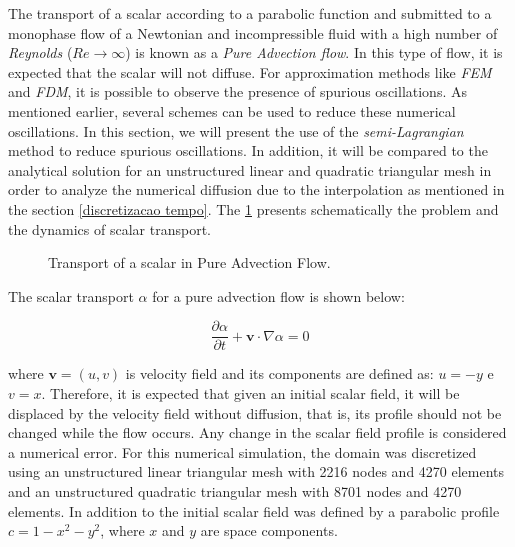 The transport of a scalar according to a parabolic function and 
submitted to a monophase flow of a Newtonian and incompressible fluid 
with a high number of \textit{Reynolds} 
($\textit{Re} \rightarrow \infty$) is known as a 
\textit{Pure Advection flow}. In this type of flow, 
it is expected that the scalar will not diffuse. 
For approximation methods like \textit{FEM} and \textit{FDM}, 
it is possible to observe the presence of spurious oscillations. 
As mentioned earlier, several schemes can be used to reduce these 
numerical oscillations. In this section, we will present the use 
of the \textit{semi-Lagrangian} method to reduce spurious oscillations.
In addition, it will be compared to the analytical solution for an
unstructured linear and quadratic triangular mesh 
in order to analyze the numerical diffusion due to the interpolation
as mentioned in the section \ref{discretizacao tempo}. 
The \ref{conveccao} presents schematically the problem and 
the dynamics of scalar transport.

\vspace{0.5cm}
\begin{figure}[H]
\caption{Transport of a scalar in Pure Advection Flow.}
\begin{center}
\end{center}
\label{conveccao}
\end{figure}

\medskip
\noindent
The scalar transport $\alpha$ for a pure advection flow is shown below:


\begin{equation}
 \frac{\partial \alpha}{\partial t} 
 + 
 \textbf{v} \cdot \nabla \alpha
 = 0
\end{equation}

\noindent
where $\textbf{v} = (u,v)$ is velocity field and its components are
defined as: $u = -y$ e $v = x$. 
Therefore, it is expected that given an initial scalar field, 
it will be displaced by the velocity field without diffusion, 
that is, its profile should not be changed while the flow occurs. 
Any change in the scalar field profile is considered a numerical error.
For this numerical simulation, the domain was discretized using an
unstructured linear triangular mesh with 2216 nodes and 4270 elements
and an unstructured quadratic triangular mesh with 8701 nodes 
and 4270 elements.
In addition to the initial scalar field was defined by a parabolic
profile $c = 1 - x^2 - y^2$, where $x$ and $y$ are space components.



